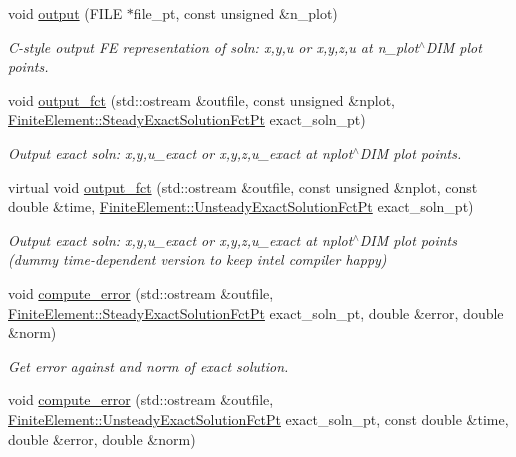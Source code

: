 \begin{DoxyCompactItemize}
void \hyperlink{classoomph_1_1GeneralisedAdvectionDiffusionEquations_afcc8b4ee77728a11e26f8cd512874832}{output} (F\+I\+LE $\ast$file\+\_\+pt, const unsigned \&n\+\_\+plot)
\begin{DoxyCompactList}\small\item\em C-\/style output FE representation of soln\+: x,y,u or x,y,z,u at n\+\_\+plot$^\wedge$\+D\+IM plot points. \end{DoxyCompactList}\item 
void \hyperlink{classoomph_1_1GeneralisedAdvectionDiffusionEquations_ac7bae95f78ecec53436902a7da1f6a92}{output\+\_\+fct} (std\+::ostream \&outfile, const unsigned \&nplot, \hyperlink{classoomph_1_1FiniteElement_a690fd33af26cc3e84f39bba6d5a85202}{Finite\+Element\+::\+Steady\+Exact\+Solution\+Fct\+Pt} exact\+\_\+soln\+\_\+pt)
\begin{DoxyCompactList}\small\item\em Output exact soln\+: x,y,u\+\_\+exact or x,y,z,u\+\_\+exact at nplot$^\wedge$\+D\+IM plot points. \end{DoxyCompactList}\item 
virtual void \hyperlink{classoomph_1_1GeneralisedAdvectionDiffusionEquations_a41914c83c67c4de8d2d504c918e04872}{output\+\_\+fct} (std\+::ostream \&outfile, const unsigned \&nplot, const double \&time, \hyperlink{classoomph_1_1FiniteElement_ad4ecf2b61b158a4b4d351a60d23c633e}{Finite\+Element\+::\+Unsteady\+Exact\+Solution\+Fct\+Pt} exact\+\_\+soln\+\_\+pt)
\begin{DoxyCompactList}\small\item\em Output exact soln\+: x,y,u\+\_\+exact or x,y,z,u\+\_\+exact at nplot$^\wedge$\+D\+IM plot points (dummy time-\/dependent version to keep intel compiler happy) \end{DoxyCompactList}\item 
void \hyperlink{classoomph_1_1GeneralisedAdvectionDiffusionEquations_a2cdd1b0c5ad536a0f2e20fb24474bd8c}{compute\+\_\+error} (std\+::ostream \&outfile, \hyperlink{classoomph_1_1FiniteElement_a690fd33af26cc3e84f39bba6d5a85202}{Finite\+Element\+::\+Steady\+Exact\+Solution\+Fct\+Pt} exact\+\_\+soln\+\_\+pt, double \&error, double \&norm)
\begin{DoxyCompactList}\small\item\em Get error against and norm of exact solution. \end{DoxyCompactList}\item 
void \hyperlink{classoomph_1_1GeneralisedAdvectionDiffusionEquations_ac7ebfa809051e73ec064fea8231811a3}{compute\+\_\+error} (std\+::ostream \&outfile, \hyperlink{classoomph_1_1FiniteElement_ad4ecf2b61b158a4b4d351a60d23c633e}{Finite\+Element\+::\+Unsteady\+Exact\+Solution\+Fct\+Pt} exact\+\_\+soln\+\_\+pt, const double \&time, double \&error, double \&norm)

\end{DoxyCompactItemize}

